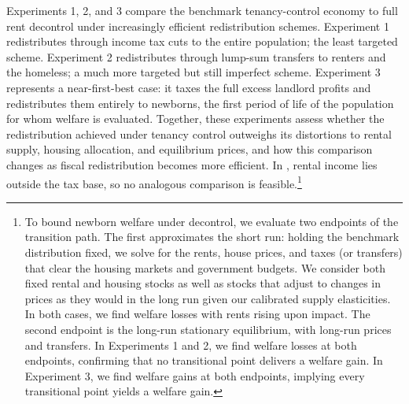 \documentclass[parskip=full]{article}
\begin{document}
Experiments 1, 2, and 3 compare the benchmark tenancy-control economy to full rent decontrol under increasingly efficient redistribution schemes. Experiment 1 redistributes through income tax cuts to the entire population; the least targeted scheme. Experiment 2 redistributes through lump-sum transfers to renters and the homeless; a much more targeted but still imperfect scheme. Experiment 3 represents a near-first-best case: it taxes the full excess landlord profits and redistributes them entirely to newborns, the first period of life of the population for whom welfare is evaluated. Together, these experiments assess whether the redistribution achieved under tenancy control outweighs its distortions to rental supply, housing allocation, and equilibrium prices, and how this comparison changes as fiscal redistribution becomes more efficient. In \citet{fmn-2023}, rental income lies outside the tax base, so no analogous comparison is feasible.\footnote{To bound newborn welfare under decontrol, we evaluate two endpoints of the transition path. The first approximates the short run: holding the benchmark distribution fixed, we solve for the rents, house prices, and taxes (or transfers) that clear the housing markets and government budgets. We consider both fixed rental and housing stocks as well as stocks that adjust to changes in prices as they would in the long run given our calibrated supply elasticities. In both cases, we find welfare losses with rents rising upon impact. The second endpoint is the long-run stationary equilibrium, with long-run prices and transfers. In Experiments 1 and 2, we find welfare losses at both endpoints, confirming that no transitional point delivers a welfare gain. In Experiment 3, we find welfare gains at both endpoints, implying every transitional point yields a welfare gain.}
\end{document}
